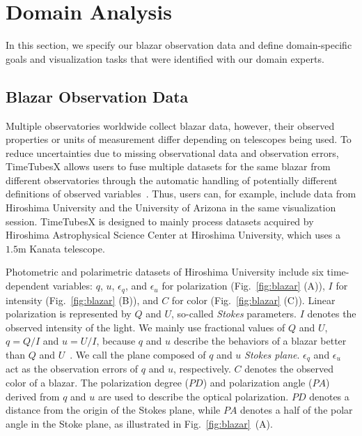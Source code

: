 \section{Domain Analysis}\label{sec:domainAnalysis}
In this section, we specify our blazar observation data and define domain-specific goals and visualization tasks that were identified with our domain experts. 

\subsection{Blazar Observation Data}\label{sec:BlazarData}
Multiple observatories worldwide collect blazar data, however, their observed properties or units of measurement differ depending on telescopes being used. 
To reduce uncertainties due to missing observational data and observation errors,
TimeTubesX allows users to fuse multiple datasets for the same blazar from different observatories 
through the automatic handling of potentially different definitions of observed variables~\cite{Fujishiro2018}.
Thus, users can, for example, include data from Hiroshima University and the University of Arizona in the same visualization session. 
TimeTubesX is designed to mainly process datasets acquired by Hiroshima Astrophysical Science Center at Hiroshima University,
which uses a $1.5\mathrm{m}$ Kanata telescope. 

Photometric and polarimetric datasets of Hiroshima University include six time-dependent variables: $q$, $u$, $\epsilon_q$, and $\epsilon_u$ for polarization (Fig.~\ref{fig:blazar} (A)), $I$ for intensity (Fig.~\ref{fig:blazar} (B)), and $C$ for color (Fig.~\ref{fig:blazar} (C)).
Linear polarization is represented by $Q$ and $U$, so-called \textit{Stokes} parameters.
$I$ denotes the observed intensity of the light.
We mainly use fractional values of $Q$ and $U$, $q = Q / I$ and $u = U / I$, 
because $q$ and $u$ describe the behaviors of a blazar better than $Q$ and $U$~\cite{Uemura2016}.
We call the plane composed of $q$ and $u$ \textit{Stokes plane}.
$\epsilon_q$ and $\epsilon_u$ act as the observation errors of $q$ and $u$, respectively.
$C$ denotes the observed color of a blazar.
The polarization degree ($PD$) and polarization angle ($PA$) derived from $q$ and $u$ are used to describe the optical polarization.
$PD$ denotes a distance from the origin of the Stokes plane, 
while $PA$ denotes a half of the polar angle in the Stoke plane, as illustrated in Fig.~\ref{fig:blazar}~(A).

